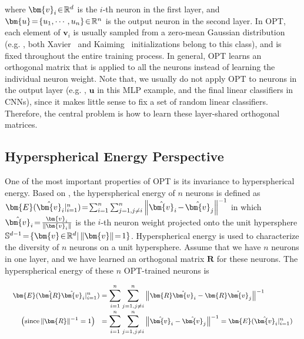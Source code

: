  where $\thickmuskip=2mu \medmuskip=2mu \bm{v}_i\in\mathbb{R}^d$ is the $i$-th neuron in the first layer, and $\thickmuskip=2mu \medmuskip=2mu \bm{u}=\{u_1,\cdots,u_n\}\in\mathbb{R}^n$ is the output neuron in the second layer. In OPT, each element of $\bm{v}_i$ is usually sampled from a zero-mean Gaussian distribution (e.g. , both Xavier~\cite{glorot2010understanding} and Kaiming~\cite{he2015delving} initializations belong to this class), and is fixed throughout the entire training process. In general, OPT learns an orthogonal matrix that is applied to all the neurons instead of learning the individual neuron weight. Note that, we usually do not apply OPT to neurons in the output layer (e.g. , $\bm{u}$ in this MLP example, and the final linear classifiers in CNNs), since it makes little sense to fix a set of random linear classifiers. Therefore, the central problem is how to learn these layer-shared orthogonal matrices.

\subsection{Hyperspherical Energy Perspective}

One of the most important properties of OPT is its invariance to hyperspherical energy. Based on \cite{liu2018learning}, the hyperspherical energy of $n$ neurons is defined as $\thickmuskip=2mu \medmuskip=2mu \bm{E}(\hat{\bm{v}}_i|_{i=1}^n) = \sum_{i=1}^{n}\sum_{j=1,j\neq i}^{n} \left\lVert\hat{\bm{v}}_i-\hat{\bm{v}}_j\right\rVert^{-1}$ in which $\thickmuskip=2mu \medmuskip=2mu \hat{\bm{v}}_i=\frac{\bm{v}_i}{\|\bm{v}_i\|}$ is the $i$-th neuron weight projected onto the unit hypersphere $\thickmuskip=2mu \medmuskip=2mu \mathbb{S}^{d-1}=\{\bm{v}\in\mathbb{R}^{d}|\left\lVert\bm{v}\right\rVert=1\}$. Hyperspherical energy is used to characterize the diversity of $n$ neurons on a unit hypersphere. Assume that we have $n$ neurons in one layer, and we have learned an orthogonal matrix $\bm{R}$ for these neurons. The hyperspherical energy of these $n$ OPT-trained neurons is

\begin{equation}
\footnotesize
\begin{aligned}
    \bm{E}(\hat{\bm{R}}\hat{\bm{v}}_i|_{i=1}^n) &= \sum_{i=1}^{n}\sum_{j=1,j\neq i}^{n} \left\lVert\bm{R}\hat{\bm{v}}_i-\bm{R}\hat{\bm{v}}_j\right\rVert^{-1}\\[-1mm]
    \big(\textnormal{since} \left\lVert\bm{R}\right\rVert^{-1}=1\big)\ \  &= \sum_{i=1}^{n}\sum_{j=1,j\neq i}^{n} \left\lVert\hat{\bm{v}}_i-\hat{\bm{v}}_j\right\rVert^{-1} =  \bm{E}(\hat{\bm{v}}_i|_{i=1}^n)
\end{aligned}
\end{equation}

